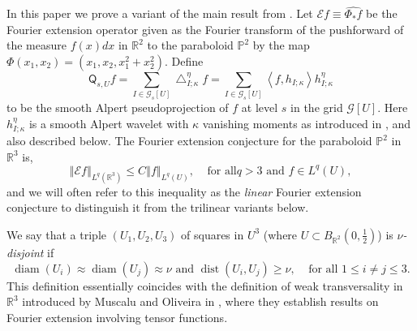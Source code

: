 \documentclass{amsart}%
\theoremstyle{plain}
\numberwithin{equation}{section}
\begin{document}
In this paper we prove a variant of the main result from \cite{RiSa}. Let
$\mathcal{E}f\equiv\widehat{\Phi_{\ast}f}$ be the Fourier extension operator
given as the Fourier transform of the pushforward of the measure $f\left(
x\right)  dx$ in $\mathbb{R}^{2}$ to the paraboloid $\mathbb{P}^{2}$ by the
map $\Phi\left(  x_{1},x_{2}\right)  =\left(  x_{1},x_{2},x_{1}^{2}+x_{2}%
^{2}\right)  $. Define
\[
\mathsf{Q}_{s,U}f=\sum_{I\in\mathcal{G}_{s}\left[  U\right]  }\bigtriangleup
_{I;\kappa}^{\eta}f=\sum_{I\in\mathcal{G}_{s}\left[  U\right]  }\left\langle
f,h_{I;\kappa}\right\rangle h_{I;\kappa}^{\eta}%
\]
to be the smooth Alpert pseudoprojection of $f$ at level $s$ in the grid
$\mathcal{G}\left[  U\right]  $. Here $h_{I;\kappa}^{\eta}$ is a smooth Alpert
wavelet with $\kappa$ vanishing moments as introduced in \cite{Saw7}, and also
described below. The Fourier extension conjecture for the paraboloid
$\mathbb{P}^{2}$ in $\mathbb{R}^{3}$ is,%
\begin{equation}
\left\Vert \mathcal{E}f\right\Vert _{L^{q}\left(  \mathbb{R}^{3}\right)  }\leq
C\left\Vert f\right\Vert _{L^{q}\left(  U\right)  },\ \ \ \ \ \text{for all
}q>3\text{ and }f\in L^{q}\left(  U\right)  ,\label{FEC}%
\end{equation}
and we will often refer to this inequality as the \emph{linear} Fourier
extension conjecture to distinguish it from the trilinear variants below.

We say that a triple $\left(  U_{1},U_{2},U_{3}\right)  $ of squares in
$U^{3}$ (where $U\subset B_{\mathbb{R}^{2}}\left(  0,\frac{1}{2}\right)  $) is
$\nu$\emph{-disjoint} if
\begin{equation}
\operatorname*{diam}\left(  U_{i}\right)  \approx\operatorname*{diam}\left(
U_{j}\right)  \approx\nu\text{ and }\operatorname*{dist}\left(  U_{i}%
,U_{j}\right)  \geq\nu,\ \ \ \ \ \text{for all }1\leq i\neq j\leq
3.\label{weak sep}%
\end{equation}
This definition essentially coincides with the definition of weak
transversality in $\mathbb{R}^{3}$ introduced by Muscalu and Oliveira in
\cite{MuOl}, where they establish results on Fourier extension involving
tensor functions.
\end{document}
